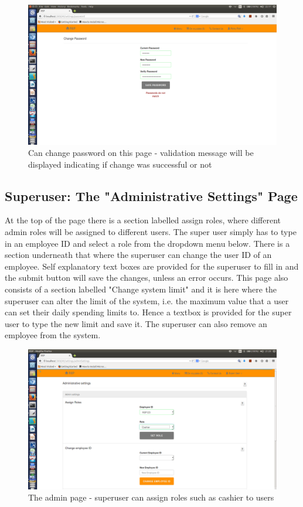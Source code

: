 \documentclass[a4paper,12pt]{report}
\begin{document}
\begin{figure}[H]
  \centering
    \includegraphics[width=1.0\textwidth]{screenshots/changePassDontMatch.png}
    \caption{Can change password on this page - validation message will be displayed indicating if change was successful or not} 
\end{figure}
\subsection{Superuser: The "Administrative Settings" Page} 
At the top of the page there is a section labelled assign roles, where different admin roles will be assigned to different users. The super user simply has to type in an employee ID and select a role from the dropdown menu below. There is a section underneath that where the superuser can change the user ID of an employee. Self explanatory text boxes are provided for the superuser to fill in and the submit button will save the changes, unless an error occurs.  This page also consists of a section labelled "Change system limit" and it is here where the superuser can alter the limit of the system, i.e. the maximum value that a user can set their daily spending limits to. Hence a textbox is provided for the super user to type the new limit and save it.  The superuser can also remove an employee from the system.
 
\begin{figure}[H]
  \centering
    \includegraphics[width=1.0\textwidth]{screenshots/assignRole.png}
    \caption{The admin page - superuser can assign roles such as cashier to users} 
\end{figure}
\end{document}
